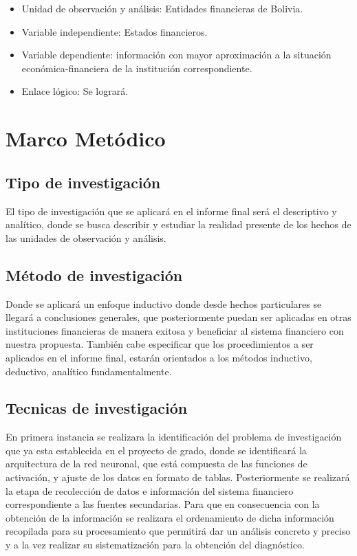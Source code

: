 \documentclass[
  12pt,
]{article}
\providecommand{\tightlist}{%
  \setlength{\itemsep}{0pt}\setlength{\parskip}{0pt}}
\begin{document}
\begin{itemize}
\tightlist
\item
  Unidad de observación y análisis: Entidades financieras de Bolivia.
\item
  Variable independiente: Estados financieros.
\item
  Variable dependiente: información con mayor aproximación a la
  situación económica-financiera de la institución correspondiente.
\item
  Enlace lógico: Se logrará.
\end{itemize}

\hypertarget{marco-metuxf3dico}{%
\section{Marco Metódico}\label{marco-metuxf3dico}}

\hypertarget{tipo-de-investigaciuxf3n}{%
\subsection{Tipo de investigación}\label{tipo-de-investigaciuxf3n}}

El tipo de investigación que se aplicará en el informe final será el
descriptivo y analítico, donde se busca describir y estudiar la realidad
presente de los hechos de las unidades de observación y análisis.

\hypertarget{muxe9todo-de-investigaciuxf3n}{%
\subsection{Método de
investigación}\label{muxe9todo-de-investigaciuxf3n}}

Donde se aplicará un enfoque inductivo donde desde hechos particulares
se llegará a conclusiones generales, que posteriormente puedan ser
aplicadas en otras instituciones financieras de manera exitosa y
beneficiar al sistema financiero con nuestra propuesta. También cabe
especificar que los procedimientos a ser aplicados en el informe final,
estarán orientados a los métodos inductivo, deductivo, analítico
fundamentalmente.

\hypertarget{tecnicas-de-investigaciuxf3n}{%
\subsection{Tecnicas de
investigación}\label{tecnicas-de-investigaciuxf3n}}

En primera instancia se realizara la identificación del problema de
investigación que ya esta establecida en el proyecto de grado, donde se
identificará la arquitectura de la red neuronal, que está compuesta de
las funciones de activación, y ajuste de los datos en formato de tablas.
Posteriormente se realizará la etapa de recolección de datos e
información del sistema financiero correspondiente a las fuentes
secundarias. Para que en consecuencia con la obtención de la información
se realizara el ordenamiento de dicha información recopilada para su
procesamiento que permitirá dar un análisis concreto y preciso y a la
vez realizar su sistematización para la obtención del diagnóstico.
\end{document}
